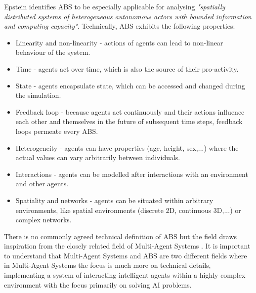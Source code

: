 Epstein \cite{epstein_generative_2012} identifies ABS to be especially applicable for analysing \textit{"spatially distributed systems of heterogeneous autonomous actors with bounded information and computing capacity"}. Technically, ABS exhibits the following properties:

\begin{itemize}
	\item Linearity and non-linearity - actions of agents can lead to non-linear behaviour of the system.
	\item Time - agents act over time, which is also the source of their pro-activity.
	\item State - agents encapsulate state, which can be accessed and changed during the simulation.
	\item Feedback loop - because agents act continuously and their actions influence each other and themselves in the future of subsequent time steps, feedback loops permeate every ABS. 
	\item Heterogeneity - agents can have properties (age, height, sex,...) where the actual values can vary arbitrarily between individuals.
	\item Interactions - agents can be modelled after interactions with an environment and other agents.
	\item Spatiality and networks - agents can be situated within arbitrary environments, like spatial environments (discrete 2D, continuous 3D,...) or complex networks.
\end{itemize}

There is no commonly agreed technical definition of ABS but the field draws inspiration from the closely related field of Multi-Agent Systems \cite{weiss_multiagent_2013,wooldridge_introduction_2009}. It is important to understand that Multi-Agent Systems and ABS are two different fields where in Multi-Agent Systems the focus is much more on technical details, implementing a system of interacting intelligent agents within a highly complex environment with the focus primarily on solving AI problems.

\medskip

